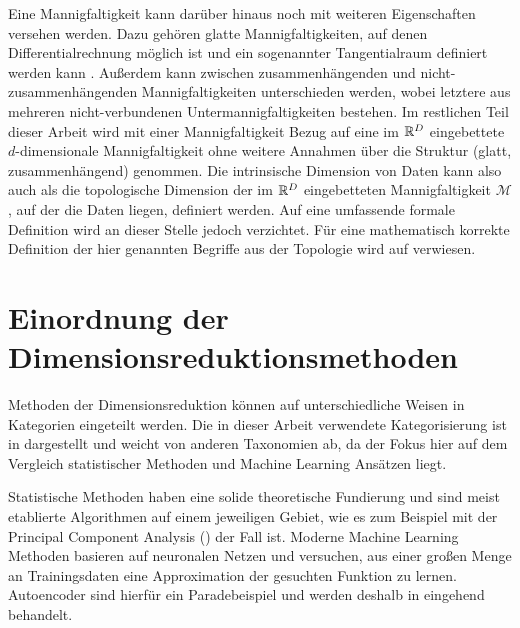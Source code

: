Eine Mannigfaltigkeit kann darüber hinaus noch mit weiteren Eigenschaften versehen werden. Dazu
gehören glatte Mannigfaltigkeiten, auf denen Differentialrechnung möglich ist und ein sogenannter
Tangentialraum definiert werden kann \parencite[50 -- 75]{Lee.2012}. Außerdem kann zwischen zusammenhängenden und nicht-zusammenhängenden
Mannigfaltigkeiten unterschieden werden, wobei letztere aus mehreren nicht-verbundenen
Untermannigfaltigkeiten bestehen. Im restlichen Teil dieser Arbeit wird mit einer Mannigfaltigkeit
Bezug auf eine im $\mathbb{R}^D$ eingebettete $d$-dimensionale Mannigfaltigkeit ohne weitere Annahmen
über die Struktur (glatt, zusammenhängend) genommen. Die intrinsische Dimension von Daten kann also
auch als die topologische Dimension der im $\mathbb{R}^D$ eingebetteten Mannigfaltigkeit $\mathcal{M}$,
auf der die Daten liegen, definiert werden. Auf eine umfassende formale Definition wird an dieser
Stelle jedoch verzichtet. Für eine mathematisch korrekte Definition der hier genannten Begriffe aus
der Topologie wird auf \textcites{Lee.2011}{Lee.2012} verwiesen.

\section{Einordnung der Dimensionsreduktionsmethoden}
\label{ch:Dimensionsreduktion:Ansaetze}
Methoden der Dimensionsreduktion können auf unterschiedliche Weisen in Kategorien eingeteilt werden. Die in dieser Arbeit verwendete Kategorisierung ist in  dargestellt und weicht von anderen Taxonomien ab, da der Fokus hier auf dem Vergleich statistischer Methoden und Machine Learning Ansätzen liegt.


Statistische Methoden haben eine solide theoretische Fundierung und sind meist etablierte
Algorithmen auf einem jeweiligen Gebiet, wie es zum Beispiel mit der Principal Component Analysis
() der Fall ist. Moderne Machine Learning Methoden
basieren auf neuronalen Netzen und versuchen, aus einer großen Menge an Trainingsdaten eine
Approximation der gesuchten Funktion zu lernen. Autoencoder sind hierfür ein Paradebeispiel und
werden deshalb in  eingehend behandelt.

